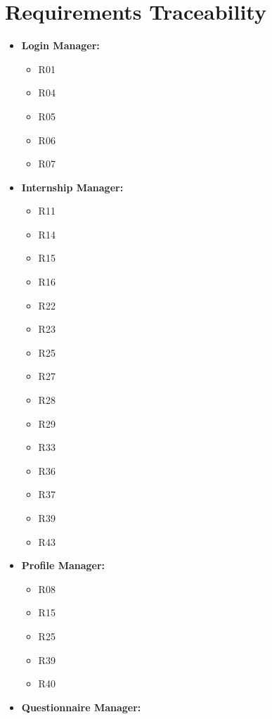\chapter{Requirements Traceability}
\label{ch:requirements-traceability}

\begin{itemize}
    \item \textbf{Login Manager:}
          \begin{itemize}
              \item R01
              \item R04
              \item R05
              \item R06
              \item R07
          \end{itemize}
    \item \textbf{Internship Manager:}
          \begin{itemize}
              \item R11
              \item R14
              \item R15
              \item R16
              \item R22
              \item R23
              \item R25
              \item R27
              \item R28
              \item R29
              \item R33
              \item R36
              \item R37
              \item R39
              \item R43
          \end{itemize}
    \item \textbf{Profile Manager:}
          \begin{itemize}
              \item R08
              \item R15
              \item R25
              \item R39
              \item R40
          \end{itemize}
    \item \textbf{Questionnaire Manager:}

\end{itemize}

